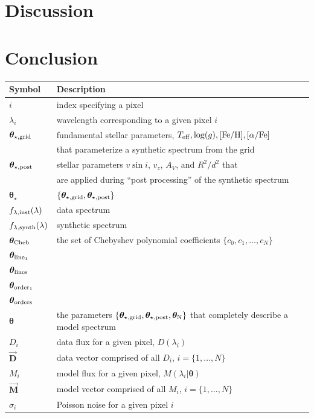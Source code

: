 \documentclass[iop,floatfix]{emulateapj}
\newcommand{\vt}{ {\bm \theta}}
\newcommand{\vg}{\vt_{\star, {\rm grid}}}
\newcommand{\vpp}{\vt_{\star, {\rm post}}}
\newcommand{\finst}{f_{\lambda, {\rm inst}}}
\newcommand{\fsynth}{f_{\lambda, {\rm synth}}}
\newcommand{\vN}{\vt_{\rm N}}
\newcommand{\vtstar}{\vt_{\star}}
\newcommand{\vtcheb}{\vt_{\rm Cheb}}
\newcommand{\vtorder}[1]{\vt_{{\rm order}_{#1}}}
\newcommand{\vtorders}{\vt_{\rm orders}}
\newcommand{\vtline}[1]{\vt_{{\rm line}_{#1}}}
\newcommand{\vtlines}{\vt_{\rm lines}}
\newcommand{\fM}{ \vec{{\bm M}}}
\newcommand{\fMi}{M_i}
\newcommand{\fD}{ \vec{{\bm D}}}
\newcommand{\fDi}{D_i}
\newcommand{\Z}{[{\rm Fe}/{\rm H}]}
\newcommand{\A}{[\alpha/{\rm Fe}]}
\begin{document}
\section{Discussion}
\label{sec:discussion}


\section{Conclusion}
\label{sec:conclusion}




\appendix

\begin{table}[!htb]
\begin{tabular}{ll}
\hline
\hline
Symbol & Description\\
\hline
\hline
$i$ & index specifying a pixel\\
$\lambda_i$ & wavelength corresponding to a given pixel $i$\\
$\vg$ & fundamental stellar parameters, $T_{\rm eff}, \log(g), \Z, \A$\\
  & that parameterize a synthetic spectrum from the grid\\
$\vpp$ & stellar parameters $v \sin i$, $v_z$, $A_V$, and $R^2/d^2$ that\\
  & are applied during ``post processing'' of the synthetic spectrum\\
$\vtstar$ & $\{\vg,\vpp \}$\\
$\finst(\lambda)$ & data spectrum\\
$\fsynth(\lambda)$ & synthetic spectrum\\
$\vtcheb$ & the set of Chebyshev polynomial coefficients $\{c_0, c_1, \ldots, c_N\}$\\
$\vtline{1}$ & \\
$\vtlines$ & \\
$\vtorder{1}$ & \\
$\vtorders$ & \\
$\vt$ & the parameters $\{\vg, \vpp, \vN\}$ that completely describe a model spectrum\\
$\fDi$ & data flux for a given pixel, $D(\lambda_i)$\\
$\fD$ & data vector comprised of all $\fDi$, $i = \{1, \ldots, N\}$\\
$\fMi$ & model flux for a given pixel, $M(\lambda_i | \vt)$\\
$\fM$ & model vector comprised of all $\fMi$, $i = \{1, \ldots, N\}$\\
$\sigma_i$ & Poisson noise for a given pixel $i$\\

\end{tabular}
\end{table}
\end{document}
